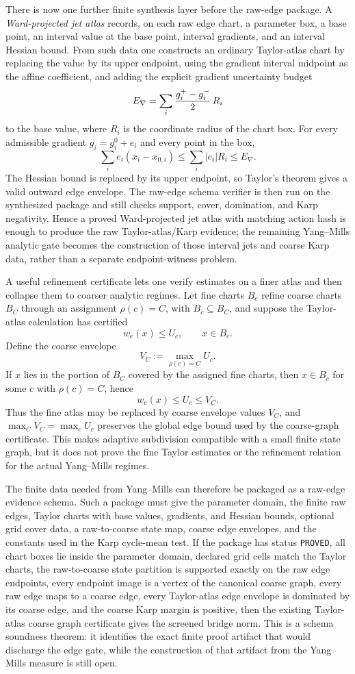 There is now one further finite synthesis layer before the raw-edge package.
A \emph{Ward-projected jet atlas} records, on each raw edge chart, a parameter
box, a base point, an interval value at the base point, interval gradients,
and an interval Hessian bound. From such data one constructs an ordinary
Taylor-atlas chart by replacing the value by its upper endpoint, using the
gradient interval midpoint as the affine coefficient, and adding the explicit
gradient uncertainty budget
\[
  E_{\nabla}=\sum_i {g_i^+-g_i^-\over 2}\,R_i
\]
to the base value, where $R_i$ is the coordinate radius of the chart box. For
every admissible gradient $g_i=g_i^0+e_i$ and every point in the box,
\[
  \sum_i e_i(x_i-x_{0,i})\leq \sum_i |e_i|R_i\leq E_{\nabla}.
\]
The Hessian bound is replaced by its upper endpoint, so Taylor's theorem gives
a valid outward edge envelope. The raw-edge schema verifier is then run on the
synthesized package and still checks support, cover, domination, and Karp
negativity. Hence a proved Ward-projected jet atlas with matching action hash
is enough to produce the raw Taylor-atlas/Karp evidence; the remaining
Yang--Mills analytic gate becomes the construction of those interval jets and
coarse Karp data, rather than a separate endpoint-witness problem.

A useful refinement certificate lets one verify estimates on a finer atlas and
then collapse them to coarser analytic regimes. Let fine charts $B_c$ refine
coarse charts $B_C$ through an assignment $\rho(c)=C$, with
$B_c\subseteq B_C$, and suppose the Taylor-atlas calculation has certified
\[
  w_e(x)\leq U_c,\qquad x\in B_c .
\]
Define the coarse envelope
\[
  V_C:=\max_{\rho(c)=C} U_c .
\]
If $x$ lies in the portion of $B_C$ covered by the assigned fine charts, then
$x\in B_c$ for some $c$ with $\rho(c)=C$, hence
\[
  w_e(x)\leq U_c\leq V_C .
\]
Thus the fine atlas may be replaced by coarse envelope values $V_C$, and
$\max_C V_C=\max_c U_c$ preserves the global edge bound used by the
coarse-graph certificate. This makes adaptive subdivision compatible with a
small finite state graph, but it does not prove the fine Taylor estimates or
the refinement relation for the actual Yang--Mills regimes.

The finite data needed from Yang--Mills can therefore be packaged as a raw-edge
evidence schema. Such a package must give the parameter domain, the finite raw
edges, Taylor charts with base values, gradients, and Hessian bounds, optional
grid cover data, a raw-to-coarse state map, coarse edge envelopes, and the
constants used in the Karp cycle-mean test. If the package has status
\texttt{PROVED}, all chart boxes lie inside the parameter domain, declared grid
cells match the Taylor charts, the raw-to-coarse state partition is supported
exactly on the raw edge endpoints, every endpoint image is a vertex of the
canonical coarse graph, every raw edge maps to a coarse edge, every
Taylor-atlas edge envelope is dominated by its coarse edge, and the coarse
Karp margin is positive, then the existing Taylor-atlas coarse graph
certificate gives the screened bridge norm. This is a schema soundness theorem:
it identifies the exact finite proof artifact that would discharge the edge
gate, while the construction of that artifact from the Yang--Mills measure is
still open.

